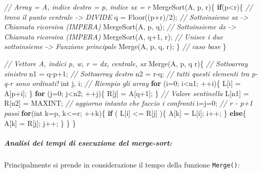 \documentclass[
]{article}
\newenvironment{Shaded}{}{}
\newcommand{\CommentTok}[1]{\textcolor[rgb]{0.38,0.63,0.69}{\textit{#1}}}
\newcommand{\ControlFlowTok}[1]{\textcolor[rgb]{0.00,0.44,0.13}{\textbf{#1}}}
\newcommand{\DataTypeTok}[1]{\textcolor[rgb]{0.56,0.13,0.00}{#1}}
\newcommand{\DecValTok}[1]{\textcolor[rgb]{0.25,0.63,0.44}{#1}}
\newcommand{\NormalTok}[1]{#1}
\begin{document}
\begin{Shaded}
\begin{Highlighting}[]
\CommentTok{// Array = A, indice destro = p, indice sx = r}
\NormalTok{MergeSort(A, p, r)\{}
	\ControlFlowTok{if}\NormalTok{(p\textless{}r)\{}
		\CommentTok{// trovo il punto centrale {-}\textgreater{} DIVIDE}
\NormalTok{        q = Floor((p+r)/}\DecValTok{2}\NormalTok{);}
        \CommentTok{// Sottoinsieme sx {-}\textgreater{} Chiamata ricorsiva (IMPERA)}
\NormalTok{        MergeSort(A, p, q);}
        \CommentTok{// Sottoinsieme dx {-}\textgreater{} Chiamata ricorsiva (IMPERA)}
\NormalTok{        MergeSort(A, q+}\DecValTok{1}\NormalTok{, r);}
        \CommentTok{// Unisce i due sottoinsieme {-}\textgreater{} Funzione principale}
\NormalTok{        Merge(A, p, q, r);}
\NormalTok{	\}}
    \CommentTok{// caso base}
\NormalTok{\}}

\CommentTok{// Vettore A, indici p, w, r = dx, centrale, sx}
\NormalTok{Merge(A, p, q r)\{}
    \CommentTok{// Sottoarray sinistro}
\NormalTok{    n1 = q{-}p+}\DecValTok{1}\NormalTok{;}
    \CommentTok{// Sottoarray destro}
\NormalTok{    n2 = r{-}q;}
    \CommentTok{// tutti questi elementi tra p{-}q{-}r sono ordinati!}
    \DataTypeTok{int}\NormalTok{ j, i;}
    \CommentTok{// Riempio gli array}
    \ControlFlowTok{for}\NormalTok{ (i=}\DecValTok{0}\NormalTok{; i\textless{}n1; ++i)\{ L[i] = A[p+i]; \}}
    \ControlFlowTok{for}\NormalTok{ (j=}\DecValTok{0}\NormalTok{; j\textless{}n2; ++j)\{ R[j] = A[q+}\DecValTok{1}\NormalTok{]; \}}
    \CommentTok{// Valore sentinella}
\NormalTok{    L[n1] = R[n2] = MAXINT;}
   \CommentTok{// aggiorno intanto che faccio i confronti}
\NormalTok{    i=j=}\DecValTok{0}\NormalTok{;}
    \CommentTok{// r {-} p+1 passi}
    \ControlFlowTok{for}\NormalTok{(}\DataTypeTok{int}\NormalTok{ k=p, k\textless{}=r; ++k)\{ }
        \ControlFlowTok{if}\NormalTok{ ( L[i] \textless{}= R[j] )\{}
\NormalTok{            A[k] = L[i];}
\NormalTok{            i++;}
\NormalTok{        \} }\ControlFlowTok{else}\NormalTok{\{}
\NormalTok{            A[k] = R[j];}
\NormalTok{            j++;}
\NormalTok{        \}}
\NormalTok{    \}}
\NormalTok{\}}
\end{Highlighting}
\end{Shaded}

\hypertarget{header-n1702}{%
\subparagraph{\texorpdfstring{Analisi dei tempi di esecuzione del
\emph{merge-sort}:}{Analisi dei tempi di esecuzione del merge-sort:}}\label{header-n1702}}

Principalmente si prende in considerazione il tempo della funzione
\texttt{Merge()}:
\end{document}
